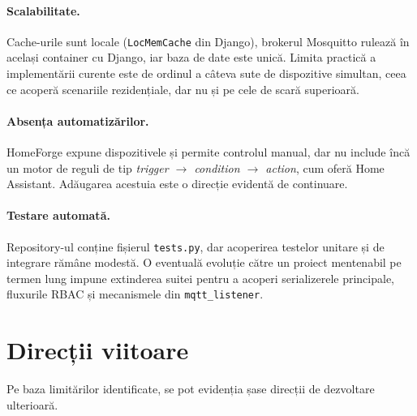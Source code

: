 \paragraph*{Scalabilitate.} Cache-urile sunt locale (\texttt{LocMemCache} din Django), brokerul Mosquitto rulează în același container cu Django, iar baza de date este unică. Limita practică a implementării curente este de ordinul a câteva sute de dispozitive simultan, ceea ce acoperă scenariile rezidențiale, dar nu și pe cele de scară superioară.

\paragraph*{Absența automatizărilor.} HomeForge expune dispozitivele și permite controlul manual, dar nu include încă un motor de reguli de tip \emph{trigger $\rightarrow$ condition $\rightarrow$ action}, cum oferă Home Assistant. Adăugarea acestuia este o direcție evidentă de continuare.

\paragraph*{Testare automată.} Repository-ul conține fișierul \texttt{tests.py}, dar acoperirea testelor unitare și de integrare rămâne modestă. O eventuală evoluție către un proiect mentenabil pe termen lung impune extinderea suitei pentru a acoperi serializerele principale, fluxurile RBAC și mecanismele din \texttt{mqtt\_listener}.

\section*{Direcții viitoare}
Pe baza limitărilor identificate, se pot evidenția șase direcții de dezvoltare ulterioară.

